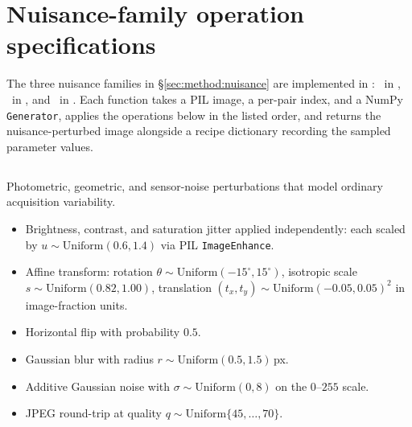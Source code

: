 \section{Nuisance-family operation specifications}
\label{app:nuisance-operations}

The three nuisance families in \S\ref{sec:method:nuisance} are
implemented in : \strongfam\ in
, \strongholdone\ in
, and \strongholdtwo\ in
. Each function takes a PIL
image, a per-pair index, and a NumPy \texttt{Generator}, applies the
operations below in the listed order, and returns the
nuisance-perturbed image alongside a recipe dictionary recording the
sampled parameter values.

\subsection*{\strongfam}
Photometric, geometric, and sensor-noise perturbations that model
ordinary acquisition variability.
\begin{itemize}
\item Brightness, contrast, and saturation jitter applied independently:
      each scaled by $u \sim \mathrm{Uniform}(0.6, 1.4)$ via PIL
      \texttt{ImageEnhance}.
\item Affine transform: rotation $\theta \sim \mathrm{Uniform}(-15^{\circ}, 15^{\circ})$,
      isotropic scale $s \sim \mathrm{Uniform}(0.82, 1.00)$, translation
      $(t_{x}, t_{y}) \sim \mathrm{Uniform}(-0.05, 0.05)^{2}$ in image-fraction units.
\item Horizontal flip with probability $0.5$.
\item Gaussian blur with radius $r \sim \mathrm{Uniform}(0.5, 1.5)$\,px.
\item Additive Gaussian noise with $\sigma \sim \mathrm{Uniform}(0, 8)$
      on the $0$--$255$ scale.
\item JPEG round-trip at quality $q \sim \mathrm{Uniform}\{45, \dots, 70\}$.
\end{itemize}

